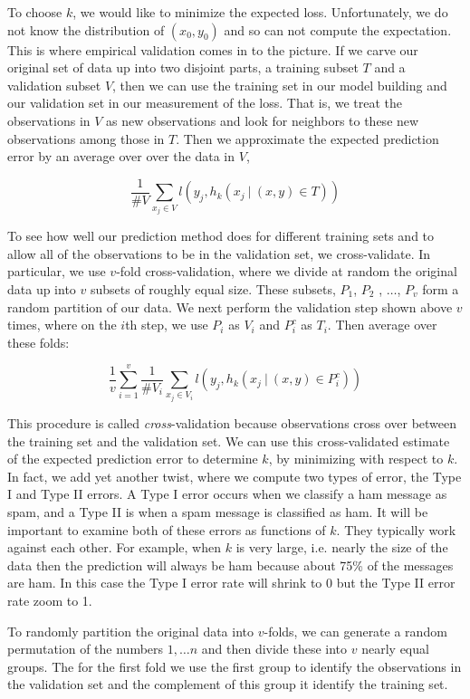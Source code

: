 To choose $k$, we would like to minimize the expected loss.
Unfortunately, we do not know the distribution of $(x_0, y_0)$
and so can not compute the expectation. This is where 
empirical validation comes in to the picture.
If we carve our original set of data up into two disjoint parts, a training
subset $T$ and a validation subset $V$, then we can use the training
set in our model building and our validation set in our measurement
of the loss.  That is, we treat the observations in $V$ as new observations 
and look for neighbors to these new observations among those in $T$.
Then we approximate the expected prediction error by an average over
over the data in $V$,

$$ \frac {1} {\#V} \sum_{x_j \in V} {l}(y_j , h_k(x_j ~|~(x,y) \in T )) $$

To see how well our prediction method does for different
training sets and to allow all of the observations to
be in the validation set, we cross-validate.
In particular, we use $v$-fold cross-validation, where we divide at random
the original data up into $v$ subsets of roughly equal size.
These subsets, $P_1$, $P_2$ , $\ldots$, $P_v$ form a random partition
of our data.
We next perform the validation step shown above $v$ times, where
on the $i$th step, we use $P_i$ as $V_i$ and $P_i^c$ as $T_i$.
Then average over these folds:

$$ \frac {1}{v} \sum_{i=1}^v \frac {1} {\#V_i} \sum_{x_j \in V_i} {l}(y_j , h_k(x_j ~|~(x,y) \in P_i^c )) $$

This procedure is called \textit{cross}-validation because observations
cross over between the training set and the validation set.
We can use this cross-validated estimate of the expected prediction
error to determine $k$, by minimizing with respect to $k$.
In fact, we add yet another twist, where we compute two types of
error, the Type I and Type II errors. A Type I error occurs when
we classify a ham message as spam, and a Type II is when a spam
message is classified as ham.  It will be important to examine
both of these errors as functions of $k$. They typically work
against each other. For example, when $k$ is very large, i.e.
nearly the size of the data then the prediction will always be
ham because about 75\% of the messages are ham. In this case the
Type I error rate will shrink to 0 but the Type II error rate
zoom to 1.

To randomly partition the original data into $v$-folds, we can
generate a random permutation of the numbers $1, \ldots n$ and
then divide these into $v$ nearly equal groups. The for the first fold
we use the first group to identify the observations in the validation
set and the complement of this group it identify the training set.

